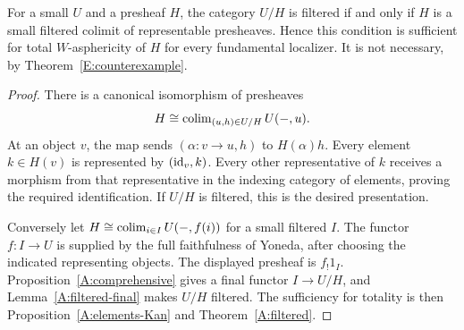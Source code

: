 \begin{proposition}\label{E:flat}
For a small $U$ and a presheaf $H$, the category $U/H$ is filtered if and only if $H$ is a small filtered colimit of representable presheaves. Hence this condition is sufficient for total $W$-asphericity of $H$ for every fundamental localizer. It is not necessary, by Theorem~\ref{E:counterexample}.
\end{proposition}
\begin{proof}
There is a canonical isomorphism of presheaves
\[
 H\cong\operatorname{colim}_{(u,h)\in U/H}U(-,u).
\]
At an object $v$, the map sends $(\alpha:v\to u,h)$ to $H(\alpha)h$. Every element $k\in H(v)$ is represented by $(\mathrm{id}_v,k)$. Every other representative of $k$ receives a morphism from that representative in the indexing category of elements, proving the required identification. If $U/H$ is filtered, this is the desired presentation.

Conversely let $H\cong\operatorname{colim}_{i\in I}U(-,f(i))$ for a small filtered $I$. The functor $f:I\to U$ is supplied by the full faithfulness of Yoneda, after choosing the indicated representing objects. The displayed presheaf is $f_!1_I$. Proposition~\ref{A:comprehensive} gives a final functor $I\to U/H$, and Lemma~\ref{A:filtered-final} makes $U/H$ filtered. The sufficiency for totality is then Proposition~\ref{A:elements-Kan} and Theorem~\ref{A:filtered}.
\end{proof}


